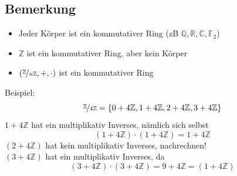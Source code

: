 \subsection{Bemerkung} %
\label{sub:bemerkung}
\begin{itemize}
	\item Jeder Körper ist ein kommutativer Ring (zB $\mathds{Q}, \mathds{R}, \mathds{C}, \mathds{F}_2$)
	\item $\mathds{Z}$ ist ein kommutativer Ring, aber kein Körper
	\item $(\nicefrac{\mathds{Z}}{n \mathds{Z}}, + , \cdot )$ ist ein kommutativer Ring
\end{itemize}
Beispiel: 
\[
	\nicefrac{\mathds{Z}}{4 \mathds{Z}} = \{ 0+4 \mathds{Z} , 1+ 4 \mathds{Z}, 2+ 4 \mathds{Z}, 3+4 \mathds{Z}\}
\]
$1+4 \mathds{Z}$ hat ein multiplikativ Inverses, nämlich sich selbst
\[
	(1+4 \mathds{Z}) \cdot (1+4 \mathds{Z}) = 1+4 \mathds{Z}
\]
$(2+4 \mathds{Z})$ hat kein multiplikativ Inverses, nachrechnen! \\
$(3+4 \mathds{Z})$ hat ein multiplikativ Inverses, da
\[
	(3+4 \mathds{Z}) \cdot (3+4 \mathds{Z}) = 9+4 \mathds{Z} = (1+4 \mathds{Z})
\]

